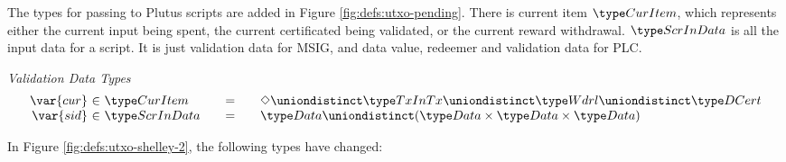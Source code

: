 The types for passing to Plutus scripts are added in Figure \ref{fig:defs:utxo-pending}.
There is current item $\CurItem$, which represents either the current input being
spent, the current certificated being validated, or the current reward
withdrawal. $\ScrInData$ is all the input data for a script. It is
just validation data for MSIG, and data value, redeemer and validation data for PLC.


\begin{figure*}[htb]
  \emph{Validation Data Types}
  \begin{equation*}
    \begin{array}{r@{~\in~}l@{\qquad=\qquad}l}
      \var{cur}
      & \CurItem
      & \Nothing \uniondistinct \TxInTx \uniondistinct \Wdrl \uniondistinct \DCert
      \\
      \var{sid}
      & \ScrInData
      & \Data \uniondistinct
        (\Data \times \Data \times \Data)
    \end{array}
  \end{equation*}
  \caption{Definitions used to make Validation Data}
  \label{fig:defs:utxo-pending}
\end{figure*}


In Figure \ref{fig:defs:utxo-shelley-2}, the following types have changed:

